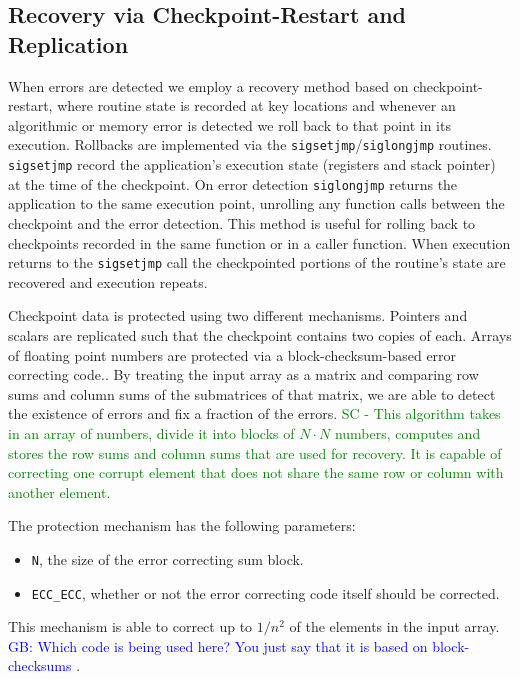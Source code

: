 \documentclass{sig-alternate}
\newcommand{\sui}[1]{%
  \textcolor{green}{SC - #1}
}
\newcommand{\greg}[1]{%
  \textcolor{blue}{GB: #1}
}
\begin{document}
\subsection{Recovery via Checkpoint-Restart and Replication}
\label{sec:res_tech:cr}

When errors are detected we employ a recovery method based on checkpoint-restart, where routine state is recorded at key locations and whenever an algorithmic or memory error is detected we roll back to that point in its execution.
Rollbacks are implemented via the \texttt{sigsetjmp}/\texttt{siglongjmp} routines.
\texttt{sigsetjmp} record the application's execution state (registers and stack pointer) at the time of the checkpoint.
On error detection \texttt{siglongjmp} returns the application to the same execution point, unrolling any function calls between the checkpoint and the error detection.
This method is useful for rolling back to checkpoints recorded in the same function or in a caller function.
When execution returns to the \texttt{sigsetjmp} call the checkpointed portions of the routine's state are recovered and execution repeats.

Checkpoint data is protected using two different mechanisms.
Pointers and scalars are replicated such that the checkpoint contains two copies of each.
Arrays of floating point numbers are protected via a block-checksum-based error correcting code..
By treating the input array as a matrix and comparing row sums and column sums of the submatrices of that matrix, we are able to detect the existence of errors and fix a fraction of the errors.
\sui{This algorithm takes in an array of numbers, divide it into blocks of $N \cdot N$ numbers, computes and stores the row sums and column sums that are used for recovery. It is capable of correcting one corrupt element that does not share the same row or column with another element.}
The protection mechanism has the following parameters:
\begin{itemize}
\item{\texttt{N}, the size of the error correcting sum block.}
\item{\texttt{ECC\_ECC}, whether or not the error correcting code itself should be corrected.}
\end{itemize}
This mechanism is able to correct up to $1/{n^2}$ of the elements in the input array.
\greg{Which code is being used here? You just say that it is based on block-checksums}.
\end{document}
